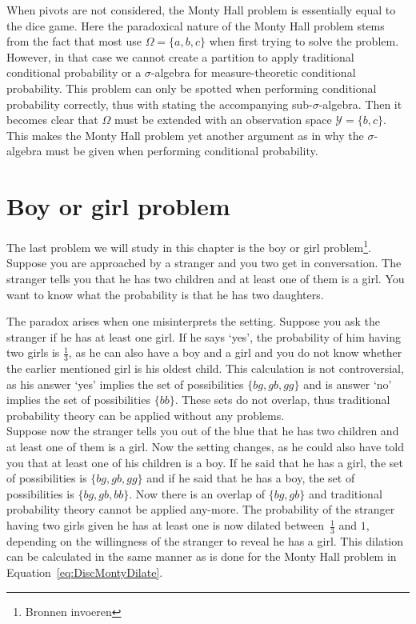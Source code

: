\documentclass[a4paper]{report}
\theoremstyle{plain}
\theoremstyle{definition}
\theoremstyle{remark}
\numberwithin{equation}{chapter}
\DeclareMathOperator{\1}{\mathbbm{1}}
\newcommand{\Y}{\mathcal{Y}}
\begin{document}
When pivots are not considered, the Monty Hall problem is essentially equal to the dice game. Here the paradoxical nature of the Monty Hall problem stems from the fact that most use $\Omega=\{a,b,c\}$ when first trying to solve the problem. However, in that case we cannot create a partition to apply traditional conditional probability or a $\sigma$-algebra for measure-theoretic conditional probability. This problem can only be spotted when performing conditional probability correctly, thus with stating the accompanying sub-$\sigma$-algebra. Then it becomes clear that $\Omega$ must be extended with an observation space $\Y=\{b,c\}$. This makes the Monty Hall problem yet another argument as in why the $\sigma$-algebra must be given when performing conditional probability.

\section{Boy or girl problem}\label{sec:DiscChildren}
The last problem we will study in this chapter is the boy or girl problem\footnote{Bronnen invoeren}. Suppose you are approached by a stranger and you two get in conversation. The stranger tells you that he has two children and at least one of them is a girl. You want to know what the probability is that he has two daughters.

The paradox arises when one misinterprets the setting. Suppose you ask the stranger if he has at least one girl. If he says `yes', the probability of him having two girls is $\frac{1}{3}$, as he can also have a boy and a girl and you do not know whether the earlier mentioned girl is his oldest child. This calculation is not controversial, as his answer `yes' implies the set of possibilities $\{bg, gb, gg\}$ and is answer `no' implies the set of possibilities $\{bb\}$. These sets do not overlap, thus traditional probability theory can be applied without any problems.\\
Suppose now the stranger tells you out of the blue that he has two children and at least one of them is a girl. Now the setting changes, as he could also have told you that at least one of his children is a boy. If he said that he has a girl, the set of possibilities is $\{bg, gb, gg\}$ and if he said that he has a boy, the set of possibilities is $\{bg, gb, bb\}$. Now there is an overlap of $\{bg, gb\}$ and traditional probability theory cannot be applied any-more. The probability of the stranger having two girls given he has at least one is now dilated between~$\frac{1}{3}$ and $1$, depending on the willingness of the stranger to reveal he has a girl. This dilation can be calculated in the same manner as is done for the Monty Hall problem in Equation~\ref{eq:DiscMontyDilate}.
\end{document}
